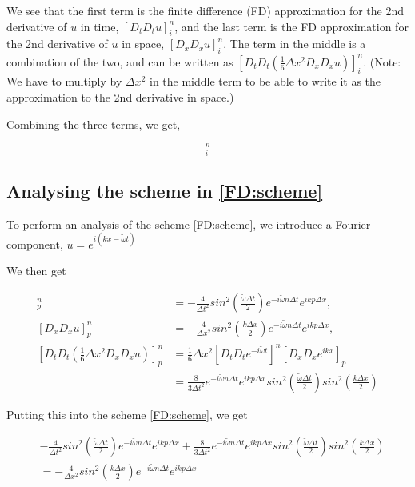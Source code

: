 \documentclass[twoside]{article}
\newcommand{\dtt}{\Delta t^2}
\newcommand{\dxx}{\Delta x^2}
\newcommand{\dt}{\Delta t}
\newcommand{\dx}{\Delta x}
\begin{document}
We see that the first term is the finite difference (FD) approximation for the 2nd derivative of $u$ in time, $[D_tD_t u]^n_i$, and the last term is the FD approximation for the 2nd derivative of $u$ in space, $[D_xD_x u]_i^n$. The term in the middle is a combination of the two, and can be written as $[D_tD_t(\frac{1}{6}\Delta x^2 D_xD_x u)]_i^n$. (Note: We have to multiply by $\Delta x^2$ in the middle term to be able to write it as the approximation to the 2nd derivative in space.)

Combining the three terms, we get,

\begin{equation}
[D_tD_t(u + \frac{1}{6}\Delta x^2 D_xD_x u) = c^2D_xD_x u]^n_i  
\label{FD:scheme}
\end{equation}


\subsection{Analysing the scheme in \eqref{FD:scheme}}

To perform an analysis of the scheme \eqref{FD:scheme}, we introduce a Fourier component, $u = e^{i(kx-\tilde{\omega}t)}$

We then get 

\begin{align*}
[D_tD_t u]^n_p &= -\frac{4}{\dtt}sin^2\left(\frac{\tilde{\omega}\dt}{2}\right)e^{-i\tilde{\omega}n\dt}e^{ikp\dx}, \\
[D_xD_x u]^n_p &= -\frac{4}{\dxx}sin^2\left(\frac{k\dx}{2}\right) e^{-i\tilde{\omega}n\dt}e^{ikp\dx}, \\
[D_tD_t(\frac{1}{6}\dxx D_xD_x u)]^n_p &= \frac{1}{6}\dxx[D_tD_te^{-i\tilde{\omega}t}]^n[D_xD_xe^{ikx}]_p\\
&= \frac{8}{3\dtt}e^{-i\tilde{\omega}n\dt}e^{ikp\dx}sin^2\left(\frac{\tilde{\omega}\dt}{2}\right)sin^2\left(\frac{k\dx}{2}\right)
\end{align*}

Putting this into the scheme \eqref{FD:scheme}, we get

\begin{align*}
&-\frac{4}{\dtt}sin^2\left(\frac{\tilde{\omega}\dt}{2}\right)e^{-i\tilde{\omega}n\dt}e^{ikp\dx} + \frac{8}{3\dtt}e^{-i\tilde{\omega}n\dt}e^{ikp\dx}sin^2\left(\frac{\tilde{\omega}\dt}{2}\right)sin^2\left(\frac{k\dx}{2}\right)\\
&= -\frac{4}{\dxx}sin^2\left(\frac{k\dx}{2}\right) e^{-i\tilde{\omega}n\dt}e^{ikp\dx}
\end{align*}
\end{document}
